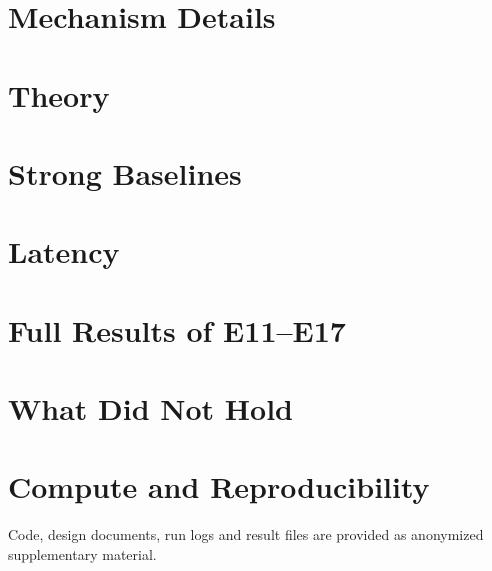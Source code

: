 \documentclass[10pt]{article}
\newif\ifarxiv\arxivfalse
\begin{document}
\FloatBarrier
\section{Mechanism Details}
\label{app:mech}


\FloatBarrier
\section{Theory}
\label{app:theory}


\FloatBarrier
\section{Strong Baselines}
\label{app:baselines}


\FloatBarrier
\section{Latency}
\label{app:latency}


\FloatBarrier
\section{Full Results of E11--E17}
\label{app:new}


\FloatBarrier
\section{What Did Not Hold}
\label{app:neg}


\FloatBarrier
\section{Compute and Reproducibility}
\label{app:repro}
\ifarxiv
Code, design documents, run logs and result files are available at \url{https://github.com/thddydgnl/dithered-world-models}.
\else
Code, design documents, run logs and result files are provided as anonymized supplementary material.
\fi


\end{document}
